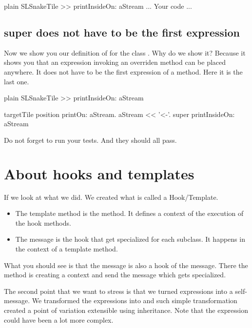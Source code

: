 \documentclass[10pt,twoside,english]{_support/latex/sbabook/sbabook}
\begin{document}
\begin{displaycode}{plain}
SLSnakeTile >> printInsideOn: aStream
	... Your code ...
\end{displaycode}
\subsection{super does not have to be the first expression}
Now we show you our definition of  for the class . Why do we show it? Because it shows you that an expression invoking an overriden method can be placed anywhere. It does not have to be the first expression of a method. Here it is the last one. 

\begin{displaycode}{plain}
SLSnakeTile >> printInsideOn: aStream

	targetTile position printOn: aStream. 
	aStream << '<-'.
	super printInsideOn: aStream
\end{displaycode}

Do not forget to run your tests. And they should all pass. 
\section{About hooks and templates}
If we look at what we did. We created what is called a Hook/Template. 

\begin{itemize}
\item The template method is the  method. It defines a context of the execution of the hook methods.
\item The  message is the hook that get specialized for each subclass. It happens in the context of a template method. 
\end{itemize}

What you should see is that the  message is also a hook of the  message. There the  method is creating a context and send the message  which gets specialized. 

The second point that we want to stress is that we turned expressions into a self-message.
We transformed the expressions  into  and such simple transformation created a point of variation extensible using inheritance. Note that the expression could have been a lot more complex. 
\end{document}
